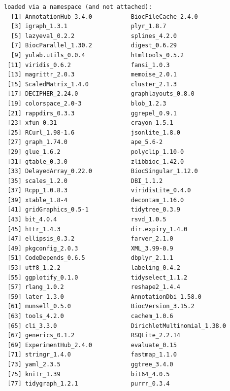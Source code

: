 \documentclass[
]{book}
\begin{document}
\begin{verbatim}
loaded via a namespace (and not attached):
  [1] AnnotationHub_3.4.0           BiocFileCache_2.4.0          
  [3] igraph_1.3.1                  plyr_1.8.7                   
  [5] lazyeval_0.2.2                splines_4.2.0                
  [7] BiocParallel_1.30.2           digest_0.6.29                
  [9] yulab.utils_0.0.4             htmltools_0.5.2              
 [11] viridis_0.6.2                 fansi_1.0.3                  
 [13] magrittr_2.0.3                memoise_2.0.1                
 [15] ScaledMatrix_1.4.0            cluster_2.1.3                
 [17] DECIPHER_2.24.0               graphlayouts_0.8.0           
 [19] colorspace_2.0-3              blob_1.2.3                   
 [21] rappdirs_0.3.3                ggrepel_0.9.1                
 [23] xfun_0.31                     crayon_1.5.1                 
 [25] RCurl_1.98-1.6                jsonlite_1.8.0               
 [27] graph_1.74.0                  ape_5.6-2                    
 [29] glue_1.6.2                    polyclip_1.10-0              
 [31] gtable_0.3.0                  zlibbioc_1.42.0              
 [33] DelayedArray_0.22.0           BiocSingular_1.12.0          
 [35] scales_1.2.0                  DBI_1.1.2                    
 [37] Rcpp_1.0.8.3                  viridisLite_0.4.0            
 [39] xtable_1.8-4                  decontam_1.16.0              
 [41] gridGraphics_0.5-1            tidytree_0.3.9               
 [43] bit_4.0.4                     rsvd_1.0.5                   
 [45] httr_1.4.3                    dir.expiry_1.4.0             
 [47] ellipsis_0.3.2                farver_2.1.0                 
 [49] pkgconfig_2.0.3               XML_3.99-0.9                 
 [51] CodeDepends_0.6.5             dbplyr_2.1.1                 
 [53] utf8_1.2.2                    labeling_0.4.2               
 [55] ggplotify_0.1.0               tidyselect_1.1.2             
 [57] rlang_1.0.2                   reshape2_1.4.4               
 [59] later_1.3.0                   AnnotationDbi_1.58.0         
 [61] munsell_0.5.0                 BiocVersion_3.15.2           
 [63] tools_4.2.0                   cachem_1.0.6                 
 [65] cli_3.3.0                     DirichletMultinomial_1.38.0  
 [67] generics_0.1.2                RSQLite_2.2.14               
 [69] ExperimentHub_2.4.0           evaluate_0.15                
 [71] stringr_1.4.0                 fastmap_1.1.0                
 [73] yaml_2.3.5                    ggtree_3.4.0                 
 [75] knitr_1.39                    bit64_4.0.5                  
 [77] tidygraph_1.2.1               purrr_0.3.4                  

\end{verbatim}
\end{document}
